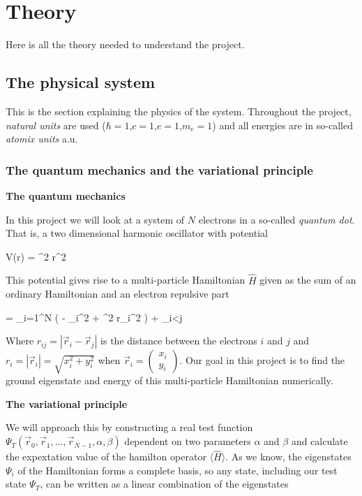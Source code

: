 \section{Theory}
Here is all the theory needed to understand the project.


\subsection{The physical system}
This is the section explaining the physics of the system. 
Throughout the project, \textit{natural units} are used ($\hbar = 1$,$c=1$,$e=1$,$m_e=1$) and all energies are in so-called \textit{atomix units} a.u. 

\subsubsection{The quantum mechanics and the variational principle} \label{sec:quantum_mechanics}

\textbf{The quantum mechanics}

In this project we will look at a system of $N$ electrons in a so-called \textit{quantum dot}.
That is, a two dimensional harmonic oscillator with potential 

\eqs
V(\vec r) =  \omega^2 r^2
\label{eq:harmonic_oscillator_potential}
\eqf

This potential gives rise to a multi-particle Hamiltonian $\hat{H}$ given as the sum of an ordinary Hamiltonian and an electron repulsive part

\eqs
{} = \sum_{i=1}^N \left ( - \nabla_i^2 +  \omega^2 r_i^2 \right ) + \sum_{i<j}  
\label{eq:harmonic_oscillator_hamiltonian}
\eqf

Where $r_{ij} = |\vec r_i - \vec r_j| $ is the distance between the electrons $i$ and $j$ and $r_i = |\vec r_i | = \sqrt{x_i^2 + y_i^2}$ when $\vec r_i = \left ( \begin{matrix} x_i \\ y_i \end{matrix} \right ) $. 
Our goal in this project is to find the ground eigenstate and energy of this multi-particle Hamiltonian numerically. 

\vspace{0.5cm}
\textbf{The variational principle}

We will approach this by constructing a real test function $\Psi_T(\vec r_0, \vec r_1, ... , \vec r_{N-1}, \alpha,\beta )$ dependent on two parameters $\alpha$ and $\beta$ and calculate the expextation value of the hamilton operator $\langle \hat{H} \rangle $. 
As we know, the eigenstates $\Psi_i$ of the Hamiltonian forms a complete basis, so any state, including our test state $\Psi_T$, can be written as a linear combination of the eigenstates 

